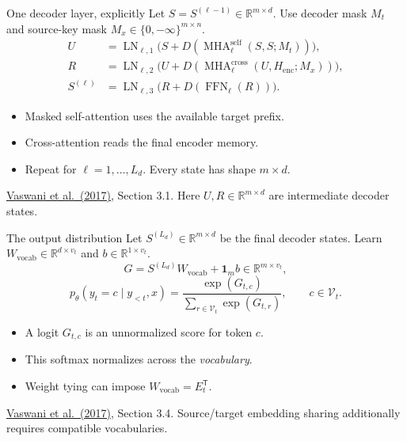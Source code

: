 \documentclass[aspectratio=169,11pt]{beamer}
\newcommand{\R}{\mathbb{R}}
\newcommand{\one}{\mathbf{1}}
\newcommand{\T}{\mathsf{T}}
\newcommand{\src}[1]{\par\vfill{\fontsize{7}{8.5}\selectfont\color{muted}#1}\par}
\newcommand{\paper}{\href{https://arxiv.org/abs/1706.03762}{Vaswani et al.\ (2017)}}
\DeclareMathOperator{\MHA}{MHA}
\DeclareMathOperator{\FFN}{FFN}
\DeclareMathOperator{\LN}{LN}
\begin{document}
\begin{frame}[t]{One decoder layer, explicitly}
Let $S=S^{(\ell-1)}\in\R^{m\times d}$. Use decoder mask $M_t$ and
source-key mask $M_x\in\{0,-\infty\}^{m\times n}$.
\[
\begin{aligned}
 U&=\LN_{\ell,1}\bigl(S+D(\MHA^{\mathrm{self}}_\ell(S,S;M_t))\bigr),\\[2mm]
 R&=\LN_{\ell,2}\bigl(U+D(\MHA^{\mathrm{cross}}_\ell
        (U,H_{\mathrm{enc}};M_x))\bigr),\\[2mm]
 S^{(\ell)}&=\LN_{\ell,3}\bigl(R+D(\FFN_\ell(R))\bigr).
\end{aligned}
\]
\begin{itemize}
  \item Masked self-attention uses the available target prefix.
  \item Cross-attention reads the final encoder memory.
  \item Repeat for $\ell=1,\ldots,L_d$. Every state has shape $m\times d$.
\end{itemize}
\src{\paper, Section 3.1. Here $U,R\in\R^{m\times d}$ are intermediate decoder states.}
\end{frame}

\begin{frame}[t]{The output distribution}
Let $S^{(L_d)}\in\R^{m\times d}$ be the final decoder states. Learn
$W_{\mathrm{vocab}}\in\R^{d\times v_t}$ and $b\in\R^{1\times v_t}$.
\[
 G=S^{(L_d)}W_{\mathrm{vocab}}+\one_m b\in\R^{m\times v_t},
\]
\[
 p_\theta(y_t=c\mid y_{<t},x)
   =\frac{\exp(G_{t,c})}{\sum_{r\in\mathcal V_t}\exp(G_{t,r})},
 \qquad c\in\mathcal V_t.
\]
\begin{itemize}
  \item A logit $G_{t,c}$ is an unnormalized score for token $c$.
  \item This softmax normalizes across the \emph{vocabulary}.
  \item Weight tying can impose $W_{\mathrm{vocab}}=E_t^{\T}$.
\end{itemize}
\src{\paper, Section 3.4. Source/target embedding sharing additionally requires compatible vocabularies.}
\end{frame}
\end{document}
